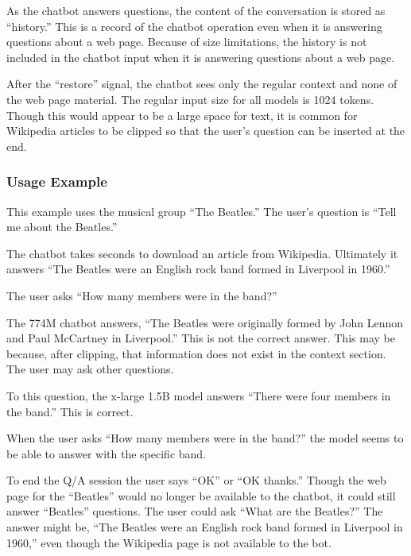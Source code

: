 As the chatbot answers questions, the content of the conversation is stored as ``history.'' %
This is a record of the chatbot operation even when it is answering questions about a web page. %
Because of size limitations, the history is not included in the chatbot input when it is answering questions about a web page. %


After the ``restore'' signal, the chatbot sees only the regular context and none of the web page material. The regular input size for all models is 1024 tokens. %
Though this would appear to be a large space for text, it is common for Wikipedia articles to be clipped so that the user's question can be inserted at the end.

\subsubsection{Usage Example}

This example uses the musical group ``The Beatles.'' The user's question is ``Tell me about the Beatles.''

The chatbot takes seconds to download an article from Wikipedia. Ultimately it answers ``The Beatles were an English rock band formed in Liverpool in 1960.''

The user asks ``How many members were in the band?''

The 774M chatbot answers, ``The Beatles were originally formed by John Lennon and Paul McCartney in Liverpool.'' This is not the correct answer. This may be because, after clipping, that information does not exist in the context section. The user may ask other questions. %

To this question, the x-large 1.5B model answers ``There were four members in the band.'' This is correct.

When the user asks ``How many members were in the band?'' the model seems to be able to answer with the specific band. %

To end the Q/A session the user says ``OK'' or ``OK thanks.'' Though the web page for the ``Beatles'' would no longer be available to the chatbot, it could still answer ``Beatles''  questions. The user could ask ``What are the Beatles?'' The answer might be, ``The Beatles were an English rock band formed in Liverpool in 1960,'' even though the Wikipedia page is not available to the bot.

